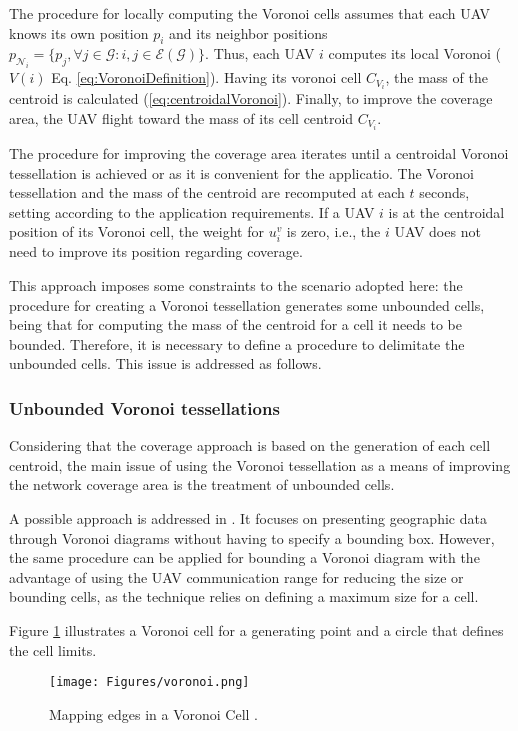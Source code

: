 The procedure for locally computing the Voronoi cells assumes that each UAV knows its own position $p_i$ and its neighbor positions $p_{\mathcal{N}_i}=\{p_j,\forall j\in\mathcal{G}: i,j \in \mathcal{E}\left(\mathcal{G}\right)\}$. Thus, each UAV $i$ computes its local Voronoi ($V(i)$ Eq. \eqref{eq:VoronoiDefinition}). Having its voronoi cell $\mathit{C}_{V_i}$, the mass of the centroid is calculated (\eqref{eq:centroidalVoronoi}). Finally, to improve the coverage area, the UAV flight toward the mass of its cell centroid $\mathit{C}_{V_i}$.

The procedure for improving the coverage area iterates until a centroidal Voronoi tessellation is achieved or as it is convenient for the applicatio. The Voronoi tessellation and the mass of the centroid are recomputed at each $t$ seconds, setting according to the application requirements. If a UAV $i$ is at the centroidal position of its Voronoi cell, the weight for $u_i^v$ is zero, i.e., the $i$  UAV does not need to improve its position regarding coverage. 

This approach imposes some constraints to the scenario adopted here: the  procedure for creating a Voronoi tessellation generates some unbounded cells, being that for computing the mass of the centroid for a cell it needs to be bounded. Therefore, it is necessary to define a procedure to delimitate the unbounded cells. This issue is addressed as follows.

\subsubsection{Unbounded Voronoi tessellations}

Considering that the coverage approach is based on the generation of each cell centroid, the main issue of using the Voronoi tessellation as a means of improving the network coverage area is the treatment of unbounded cells.

A possible approach is addressed in \cite{sang_2015}. It focuses on presenting geographic data through Voronoi diagrams without having to specify a bounding box. However, the same procedure can be applied for bounding a Voronoi diagram with the advantage of using the UAV communication range for reducing the size or bounding cells, as the technique relies on defining a maximum size for a cell.

Figure \ref{fig:voronoi} illustrates a Voronoi cell for a generating point and a circle that defines the cell limits. 
\begin{figure}[ht] \centering
	\texttt{[image: Figures/voronoi.png]}
	\caption{Mapping edges in a Voronoi Cell \cite{sang_2015}.}
	\label{fig:voronoi}	
\end{figure}
 
